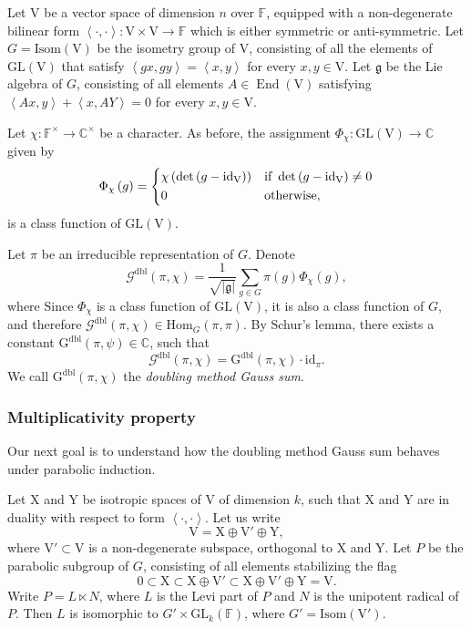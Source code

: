\documentclass[12pt, reqno]{amsart}
\theoremstyle{definition}
\theoremstyle{definition}
\theoremstyle{definition}
\newcommand{\cComplex}{\mathbb{C}}
\newcommand{\multiplicativegroup}[1]{#1^{\times}}
\newcommand{\Hom}{\mathrm{Hom}}
\newcommand{\EndomorphismRing}{\operatorname{End}}
\newcommand{\idmap}{\mathrm{id}}
\newcommand{\sizeof}[1]{\left|#1\right|}
\newcommand{\hermitianSpace}{\mathrm{V}}
\newcommand{\xIsotropic}{\mathrm{X}}
\newcommand{\yIsotropic}{\mathrm{Y}}
\newcommand{\innerproduct}[2]{\left\langle #1,#2\right\rangle}
\newcommand{\fieldCharacter}{\psi}
\newcommand{\GL}{\mathrm{GL}}
\newcommand{\finiteField}{\mathbb{F}}
\newcommand{\dblGaussSum}[2]{\mathcal{G}^{\mathrm{dbl}}\left(#1, #2\right)}
\newcommand{\dblGaussSumScalar}[2]{\mathrm{G}^{\mathrm{dbl}}\left(#1, #2\right)}
\newcommand{\IsometryGroup}{\mathrm{Isom}}
\newcommand{\lieAlgebra}{\mathfrak{g}}
\begin{document}
Let $\hermitianSpace$ be a vector space of dimension $n$ over $\finiteField$, equipped with a non-degenerate bilinear form $\innerproduct{\cdot}{\cdot} \colon \hermitianSpace \times \hermitianSpace \to \finiteField$ which is either symmetric or anti-symmetric. Let $G = \IsometryGroup \left(\hermitianSpace\right)$ be the isometry group of $\hermitianSpace$, consisting of all the elements of $\GL\left(\hermitianSpace\right)$ that satisfy $\innerproduct{gx}{gy} = \innerproduct{x}{y}$ for every $x,y \in \hermitianSpace$. Let $\lieAlgebra$ be the Lie algebra of $G$, consisting of all elements $A \in \EndomorphismRing\left(\hermitianSpace\right)$ satisfying $\innerproduct{Ax}{y} + \innerproduct{x}{AY} = 0$ for every $x, y \in \hermitianSpace$.

Let $\chi \colon \multiplicativegroup{\finiteField} \to \multiplicativegroup{\cComplex}$ be a character. As before, the assignment $\Phi_{\chi} \colon \GL\left(\hermitianSpace\right) \to \cComplex$ given by $$\Phi_{\chi}\left(g\right) = \begin{dcases}
\chi\left(\det\left(g - \idmap_{\hermitianSpace}\right)\right) & \text{if }\det\left(g - \idmap_{\hermitianSpace}\right) \ne 0\\
0 & \text{otherwise,}
\end{dcases}$$
is a class function of $\GL\left(\hermitianSpace\right)$.

Let $\pi$ be an irreducible representation of $G$. Denote $$\dblGaussSum{\pi}{\chi} = \frac{1}{\sqrt{\sizeof{\lieAlgebra}}} \sum_{g \in G} \pi\left(g\right) \Phi_{\chi}\left(g\right),$$
where  Since $\Phi_{\chi}$ is a class function of $\GL\left(\hermitianSpace\right)$, it is also a class function of $G$, and therefore $\dblGaussSum{\pi}{\chi} \in \Hom_{G}\left(\pi, \pi\right)$. By Schur's lemma, there exists a constant $\dblGaussSumScalar{\pi}{\fieldCharacter} \in \cComplex$, such that $$\dblGaussSum{\pi}{\chi} = \dblGaussSumScalar{\pi}{\chi} \cdot \idmap_\pi.$$
We call $\dblGaussSumScalar{\pi}{\chi}$ the \emph{doubling method Gauss sum}.

\subsubsection{Multiplicativity property}
Our next goal is to understand how the doubling method Gauss sum behaves under parabolic induction.

Let $\xIsotropic$ and $\yIsotropic$ be isotropic spaces of $\hermitianSpace$ of dimension $k$, such that $\xIsotropic$ and $\yIsotropic$ are in duality with respect to form $\innerproduct{\cdot}{\cdot}$. Let us write $$\hermitianSpace = \xIsotropic \oplus \hermitianSpace' \oplus \yIsotropic,$$
where $\hermitianSpace' \subset \hermitianSpace$ is a non-degenerate subspace, orthogonal to $\xIsotropic$ and $\yIsotropic$. Let $P$ be the parabolic subgroup of $G$, consisting of all elements stabilizing the flag $$0 \subset \xIsotropic \subset \xIsotropic \oplus \hermitianSpace' \subset \xIsotropic \oplus \hermitianSpace' \oplus \yIsotropic = \hermitianSpace.$$
Write $P = L \ltimes N$, where $L$ is the Levi part of $P$ and $N$ is the unipotent radical of $P$. Then $L$ is isomorphic to $G' \times \GL_k\left(\finiteField\right)$, where $G' = \IsometryGroup\left(\hermitianSpace'\right)$.
\end{document}
